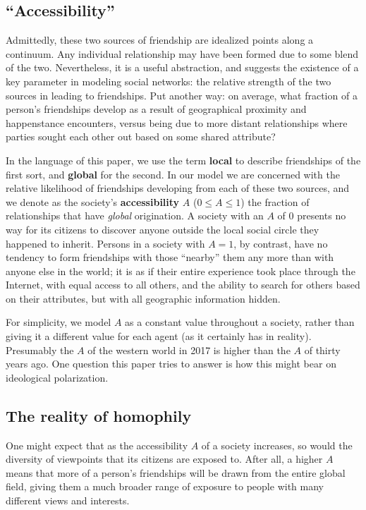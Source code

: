 \subsection{``Accessibility''}

Admittedly, these two sources of friendship are idealized points along a
continuum. Any individual relationship may have been formed due to some blend
of the two. Nevertheless, it is a useful abstraction, and suggests the
existence of a key parameter in modeling social networks: the relative
strength of the two sources in leading to friendships. Put another way: on
average, what fraction of a person's friendships develop as a result of
geographical proximity and happenstance encounters, versus being due to more
distant relationships where parties sought each other out based on some shared
attribute? 

In the language of this paper, we use the term \textbf{local} to describe
friendships of the first sort, and \textbf{global} for the second. In our
model we are concerned with the relative likelihood of friendships developing
from each of these two sources, and we denote as the society's
\textbf{accessibility} $A$ ($0 \leq A \leq 1$) the fraction of relationships
that have \textit{global} origination. A society with an $A$ of 0 presents no
way for its citizens to discover anyone outside the local social circle they
happened to inherit. Persons in a society with $A=1$, by contrast, have no
tendency to form friendships with those ``nearby'' them any more than with
anyone else in the world; it is as if their entire experience took place
through the Internet, with equal access to all others, and the ability to
search for others based on their attributes, but with all geographic
information hidden.

For simplicity, we model $A$ as a constant value throughout a society, rather
than giving it a different value for each agent (as it certainly has in
reality). Presumably the $A$ of the western world in 2017 is higher than the
$A$ of thirty years ago. One question this paper tries to answer is how this
might bear on ideological polarization.

\subsection{The reality of homophily}

One might expect that as the accessibility $A$ of a society increases, so
would the diversity of viewpoints that its citizens are exposed to. After all,
a higher $A$ means that more of a person's friendships will be drawn from the
entire global field, giving them a much broader range of exposure to people
with many different views and interests.

